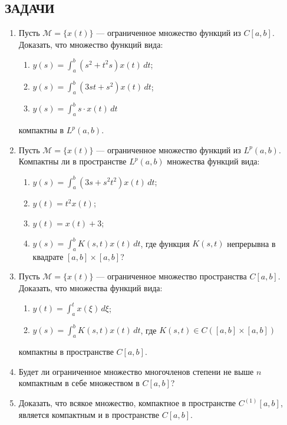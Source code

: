 \documentclass[12pt,a4paper]{article}
\begin{document}
\subsection*{ЗАДАЧИ}
\begin{enumerate}
\item Пусть $\mathcal{M} = \{x(t)\}$ — ограниченное множество функций из $C[a,b]$. Доказать, что множество функций вида:
\begin{enumerate}[label=\alph*)]
\item $y(s) = \int_{a}^{b} (s^{2} + t^{2}s)x(t) \, dt$;
\item $y(s) = \int_{a}^{b} (3st + s^{2})x(t) \, dt$;
\item $y(s) = \int_{a}^{b} s \cdot x(t) \, dt$
\end{enumerate}
компактны в $L^{p}(a,b)$.

\item Пусть $\mathcal{M} = \{x(t)\}$ — ограниченное множество функций из $L^{p}(a,b)$. Компактны ли в пространстве $L^{p}(a,b)$ множества функций вида:
\begin{enumerate}[label=\alph*)]
\item $y(s) = \int_{a}^{b} (3s + s^{2}t^{2})x(t) \, dt$;
\item $y(t) = t^{2}x(t)$;
\item $y(t) = x(t) + 3$;
\item $y(s) = \int_{a}^{b} K(s,t)x(t) \, dt$, где функция $K(s,t)$ непрерывна в квадрате $[a,b] \times [a,b]$?
\end{enumerate}

\item Пусть $\mathcal{M} = \{x(t)\}$ — ограниченное множество пространства $C[a,b]$. Доказать, что множества функций вида:
\begin{enumerate}[label=\alph*)]
\item $y(t) = \int_{a}^{t} x(\xi) \, d\xi$;
\item $y(s) = \int_{a}^{b} K(s,t)x(t) \, dt$, где $K(s,t) \in C([a,b] \times [a,b])$
\end{enumerate}
компактны в пространстве $C[a,b]$.

\item Будет ли ограниченное множество многочленов степени не выше $n$ компактным в себе множеством в $C[a,b]$?

\item Доказать, что всякое множество, компактное в пространстве $C^{(1)}[a,b]$, является компактным и в пространстве $C[a,b]$.


\end{enumerate}
\end{document}
